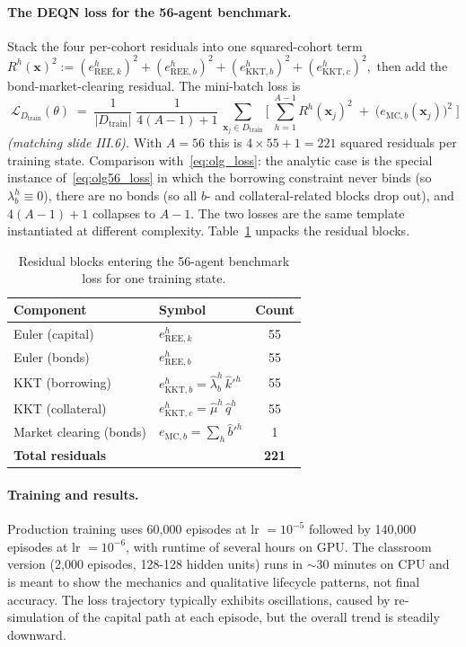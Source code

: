 \documentclass[11pt,a4paper]{report}
\newcommand{\x}{\bm{x}}
\begin{document}
\paragraph{The DEQN loss for the 56-agent benchmark.}
Stack the four per-cohort residuals into one squared-cohort term
\(
R^h(\x)^2 := (e_{\mathrm{REE},k}^h)^2 + (e_{\mathrm{REE},b}^h)^2 + (e_{\mathrm{KKT},b}^h)^2 + (e_{\mathrm{KKT},c}^h)^2,
\)
then add the bond-market-clearing residual.  The mini-batch loss is
\begin{equation}
\boxed{\;\mathcal{L}_{D_{\mathrm{train}}}(\theta)
\;=\;
\frac{1}{|D_{\mathrm{train}}|}\;\frac{1}{4(A-1)+1}\,
\sum_{\x_j\in D_{\mathrm{train}}}\!\Biggl[\;\sum_{h=1}^{A-1} R^h(\x_j)^2 \;+\; \bigl(e_{\mathrm{MC},b}(\x_j)\bigr)^2\;\Biggr]\;}
\label{eq:olg56_loss}
\end{equation}
\emph{(matching slide III.6).}  With $A=56$ this is $4\times 55 + 1 = 221$ squared residuals per training state.  Comparison with~\eqref{eq:olg_loss}: the analytic case is the special instance of~\eqref{eq:olg56_loss} in which the borrowing constraint never binds (so $\lambda_b^h\equiv 0$), there are no bonds (so all $b$- and collateral-related blocks drop out), and $4(A-1)+1$ collapses to $A-1$.  The two losses are the same template instantiated at different complexity.  Table~\ref{tab:olg56_residual_count} unpacks the residual blocks.

\begin{table}[ht]
\centering
\footnotesize
\begin{tabular}{llc}
\toprule
\textbf{Component} & \textbf{Symbol} & \textbf{Count} \\
\midrule
Euler (capital) & $e_{\mathrm{REE},k}^h$ & 55 \\
Euler (bonds) & $e_{\mathrm{REE},b}^h$ & 55 \\
KKT (borrowing) & $e_{\mathrm{KKT},b}^h = \hat\lambda_b^h\,\hat k'^h$ & 55 \\
KKT (collateral) & $e_{\mathrm{KKT},c}^h = \hat\mu^h\,\hat q^h$ & 55 \\
Market clearing (bonds) & $e_{\mathrm{MC},b} = \sum_h \hat b'^h$ & 1 \\
\midrule
\textbf{Total residuals} & & \textbf{221} \\
\bottomrule
\end{tabular}
\caption{Residual blocks entering the 56-agent benchmark loss for one training state.}
\label{tab:olg56_residual_count}
\end{table}

\paragraph{Training and results.}
Production training uses 60,000 episodes at lr $= 10^{-5}$ followed by 140,000 episodes at lr $= 10^{-6}$, with runtime of several hours on GPU.  The classroom version (2,000 episodes, 128-128 hidden units) runs in $\sim$30 minutes on CPU and is meant to show the mechanics and qualitative lifecycle patterns, not final accuracy.  The loss trajectory typically exhibits oscillations, caused by re-simulation of the capital path at each episode, but the overall trend is steadily downward.
\end{document}
